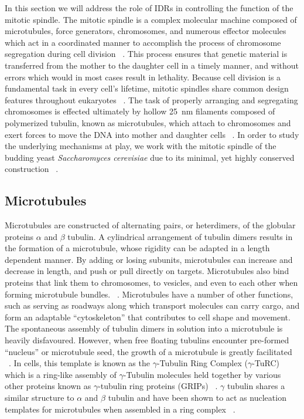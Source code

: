 In this section we will address the role of IDRs in controlling the function of the mitotic spindle. The mitotic spindle is a complex molecular machine composed of microtubules, force generators, chromosomes, and numerous effector molecules which act in a coordinated manner to accomplish the process of chromosome segregation during cell division ~\cite{karsenti2001mitotic}. This process ensures that genetic material is transferred from the mother to the daughter cell in a timely manner, and without errors which would in most cases result in lethality. Because cell division is a fundamental task in every cell's lifetime, mitotic spindles share common design features throughout eukaryotes ~\cite{kubai1976evolution}. The  task  of properly  arranging  and  segregating  chromosomes  is effected ultimately  by hollow \SI{25}{\nm} filaments composed of polymerized tubulin, known as microtubules,  which attach to chromosomes and exert forces to move the  DNA into mother and daughter  cells ~\cite{kline2004mitotic}.  In order to study the underlying mechanisms at play, we work with the mitotic spindle of the budding yeast {\it Saccharomyces cerevisiae} due to its minimal, yet highly conserved construction ~\cite{kubai1976evolution}. 

\subsection{Microtubules}

Microtubules are constructed of alternating pairs, or heterdimers, of the globular proteins $\alpha$ and $\beta$ tubulin. A cylindrical  arrangement  of tubulin  dimers results  in the  formation  of a microtubule, whose rigidity can be adapted in a length dependent manner.   By adding or losing subunits, microtubules can increase and decrease in length, and push or pull directly on targets.  Microtubules also bind proteins that link them to chromosomes, to vesicles, and even to each other when forming microtubule bundles.  ~\cite{dogterom2005force}. Microtubules  have a number  of other  functions,  such  as serving as roadways  along which transport molecules can carry cargo, and form an adaptable “cytoskeleton” that contributes to cell shape and movement. The spontaneous assembly of tubulin dimers in solution into a microtubule is heavily disfavoured. However, when free floating tubulins encounter pre-formed “nucleus” or microtubule seed, the growth of a microtubule is greatly facilitated  ~\cite{joshi1992gamma}. In cells, this template is known as the $\gamma$-Tubulin Ring Complex ($\gamma$-TuRC) which is a ring-like assembly of $\gamma$-Tubulin molecules held together by various other proteins known as $\gamma$-tubulin ring proteins (GRIPs) ~\cite{kollman2011microtubule}. $\gamma$ tubulin shares a similar structure to $\alpha$ and $\beta$ tubulin and have been shown to act as nucleation templates for microtubules when assembled in a ring complex ~\cite{kollman2011microtubule}. 


